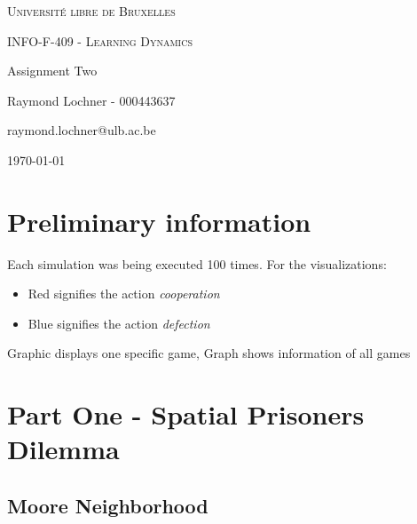 \documentclass[a4paper, 11pt]{article}
\date{\today}
\begin{document}
\begin{titlepage}
	\centering
	{\scshape\LARGE Université libre de Bruxelles \par}
	\vspace{1cm}
	{\scshape\Large INFO-F-409 - Learning Dynamics\par}
	\vspace{1.5cm}
	{\huge\bfseries {Assignment Two\par}}
	\vspace{2cm}
	{\Large Raymond Lochner - 000443637\par}
	\vspace{0.5cm}
	{\Large raymond.lochner@ulb.ac.be}
	\vfill
	
	\setcounter{tocdepth}{2} %
	\tableofcontents

\vfill
	{\large \today \par}
\end{titlepage}

\newpage

\section*{Preliminary information}

Each simulation was being executed 100 times.
For the visualizations:
\begin{itemize}[noitemsep]
  \item Red signifies the action \textit{cooperation}
  \item Blue signifies the action \textit{defection}
\end{itemize}

Graphic displays one specific game, Graph shows information of all games



\section{Part One - Spatial Prisoners Dilemma}

\subsection{Moore Neighborhood}

\newpage


\end{document}
